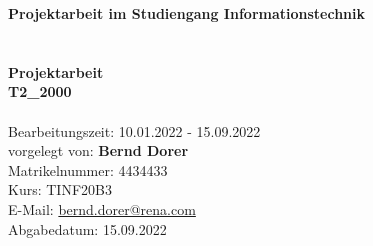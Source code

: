 \documentclass[
   ngerman          %
  ,a4paper          %
 ,12pt
]{article} %
\begin{document}
%
%
\begin{titlepage}
\noindent
\vspace*{4cm}
\begin{center}
\textbf{Projektarbeit im Studiengang Informationstechnik}\ \\
\ \\
\ \\
\Huge{\textbf{Projektarbeit}}
\\
\huge{\textbf{T2\_2000}}
\\
\ \\
\normalsize
Bearbeitungszeit: 10.01.2022 - 15.09.2022\\ %
vorgelegt von: \textbf{Bernd Dorer}\\
Matrikelnummer: 4434433\\
Kurs: TINF20B3\\
E-Mail: \href{mailto:bernd.dorer@rena.com}{bernd.dorer@rena.com}\\
Abgabedatum: 15.09.2022\\ %
\end{center}
\vfill


\end{titlepage}
\end{document}
